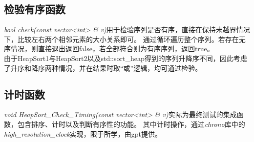 \documentclass[UTF8]{ctexart}
\begin{document}
\subsection{检验有序函数}
\textit{bool check(const vector<int> \& v)}用于检验序列是否有序，直接在保持未越界情况下，比较左右两个相邻元素的大小关系即可。
通过循环遍历整个序列。若存在无序情况，则直接退出返回false，若全部符合则为有序序列，返回true。\\
由于HeapSort1与HeapSort2以及std::sort\_heap得到的序列升降序不同，因此考虑了升序和降序两种情况，并在结果时取“或”逻辑，均可通过检验。

\subsection{计时函数}
\textit{void HeapSort\_Check\_Timing(const vector<int> \& v)}实际为最终测试的集成函数，包含排序、计时以及判断有序性的功能。
其中计时操作，通过\textit{chrono}库中的\textit{high\_resolution\_clock}实现，限于所学，由gpt提供。
\end{document}
